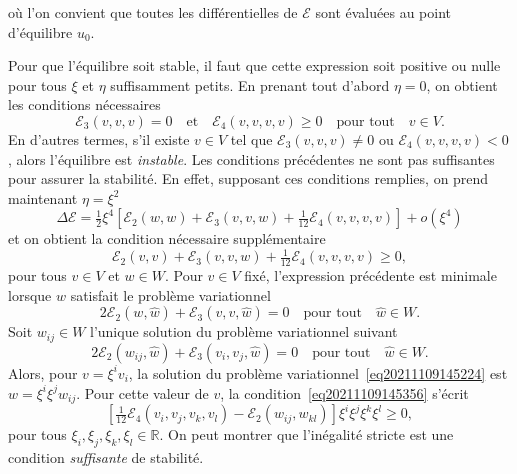 \documentclass[12pt, final]{amsart}
\begin{document}
o{\`u} l'on convient que toutes les différentielles de $\mathcal{E}$ sont
évaluées au point d'équilibre $u_0$.

Pour que l'équilibre soit stable, il faut que cette expression soit
positive ou nulle pour tous $\xi$ et $\eta$ suffisamment petits. En prenant
tout d'abord $\eta = 0$, on obtient les conditions nécessaires
\begin{equation}
  \label{eq20211108164416} \mathcal{E}_3 (v, v, v) = 0 \quad \text{et} \quad
  \mathcal{E}_4 (v, v, v, v) \geq 0 \quad \text{pour tout} \quad v \in V.
\end{equation}
En d'autres termes, s'il existe $v \in V$ tel que $\mathcal{E}_3 (v, v, v)
\neq 0$ ou $\mathcal{E}_4 (v, v, v, v) < 0$, alors l'équilibre est
\emph{instable}. Les conditions précédentes ne sont pas suffisantes
pour assurer la stabilité. En effet, supposant ces conditions remplies, on
prend maintenant $\eta = \xi^2$
\begin{equation}
  \Delta \mathcal{E}= \tfrac{1}{2} \xi^4  \left[ \mathcal{E}_2 (w, w)
  +\mathcal{E}_3 (v, v, w) + \tfrac{1}{12} \mathcal{E}_4 (v, v, v, v) \right]
  + o (\xi^4)
\end{equation}
et on obtient la condition nécessaire supplémentaire
\begin{equation}
  \label{eq20211109145356} \mathcal{E}_2 (v, v) +\mathcal{E}_3 (v, v, w) +
  \tfrac{1}{12} \mathcal{E}_4 (v, v, v, v) \geq 0,
\end{equation}
pour tous $v \in V$ et $w \in W$. Pour $v \in V$ fixé, l'expression
précédente est minimale lorsque $w$ satisfait le probl{\`e}me
variationnel
\begin{equation}
  \label{eq20211109145224} 2\mathcal{E}_2 (w, \hat{w}) +\mathcal{E}_3 (v, v,
  \hat{w}) = 0 \quad \text{pour tout} \quad \hat{w} \in W.
\end{equation}
Soit $w_{i  j} \in W$ l'unique solution du probl{\`e}me variationnel
suivant
\begin{equation}
  \label{eq20211221155859} 2\mathcal{E}_2 (w_{i  j}, \hat{w})
  +\mathcal{E}_3 (v_i, v_j, \hat{w}) = 0 \quad \text{pour tout} \quad \hat{w}
  \in W.
\end{equation}
Alors, pour $v = \xi^i v_i$, la solution du probl{\`e}me
variationnel~\eqref{eq20211109145224} est $w = \xi^i \xi^j w_{i  j}$.
Pour cette valeur de $v$, la condition~\eqref{eq20211109145356} s'écrit
\begin{equation}
  \left[ \tfrac{1}{12} \mathcal{E}_4 (v_i, v_j, v_k, v_l) -\mathcal{E}_2 (w_{i
   j}, w_{k  l}) \right] \xi^i \xi^j \xi^k \xi^l \geq 0,
\end{equation}
pour tous $\xi_i, \xi_j, \xi_k, \xi_l \in \mathbb{R}$. On peut montrer que
l'inégalité stricte est une condition \emph{suffisante} de
stabilité.
\end{document}
